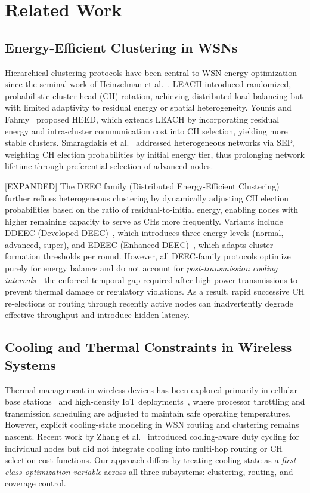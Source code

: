 \section{Related Work}

\subsection{Energy-Efficient Clustering in WSNs}
Hierarchical clustering protocols have been central to WSN energy optimization since the seminal work of Heinzelman et al.~\cite{heinzelman2000leach}. LEACH introduced randomized, probabilistic cluster head (CH) rotation, achieving distributed load balancing but with limited adaptivity to residual energy or spatial heterogeneity. Younis and Fahmy~\cite{younis2004heed} proposed HEED, which extends LEACH by incorporating residual energy and intra-cluster communication cost into CH selection, yielding more stable clusters. Smaragdakis et al.~\cite{smaragdakis2004sep} addressed heterogeneous networks via SEP, weighting CH election probabilities by initial energy tier, thus prolonging network lifetime through preferential selection of advanced nodes.

[EXPANDED] The DEEC family (Distributed Energy-Efficient Clustering)~\cite{qing2006deec} further refines heterogeneous clustering by dynamically adjusting CH election probabilities based on the ratio of residual-to-initial energy, enabling nodes with higher remaining capacity to serve as CHs more frequently. Variants include DDEEC (Developed DEEC)~\cite{elbhiri2010ddeec}, which introduces three energy levels (normal, advanced, super), and EDEEC (Enhanced DEEC)~\cite{saini2010edeec}, which adapts cluster formation thresholds per round. However, all DEEC-family protocols optimize purely for energy balance and do not account for \emph{post-transmission cooling intervals}—the enforced temporal gap required after high-power transmissions to prevent thermal damage or regulatory violations. As a result, rapid successive CH re-elections or routing through recently active nodes can inadvertently degrade effective throughput and introduce hidden latency.

\subsection{Cooling and Thermal Constraints in Wireless Systems}
Thermal management in wireless devices has been explored primarily in cellular base stations~\cite{thermal_cellular2018} and high-density IoT deployments~\cite{iot_thermal2020}, where processor throttling and transmission scheduling are adjusted to maintain safe operating temperatures. However, explicit cooling-state modeling in WSN routing and clustering remains nascent. Recent work by Zhang et al.~\cite{zhang_cooling2021} introduced cooling-aware duty cycling for individual nodes but did not integrate cooling into multi-hop routing or CH selection cost functions. Our approach differs by treating cooling state as a \emph{first-class optimization variable} across all three subsystems: clustering, routing, and coverage control.

